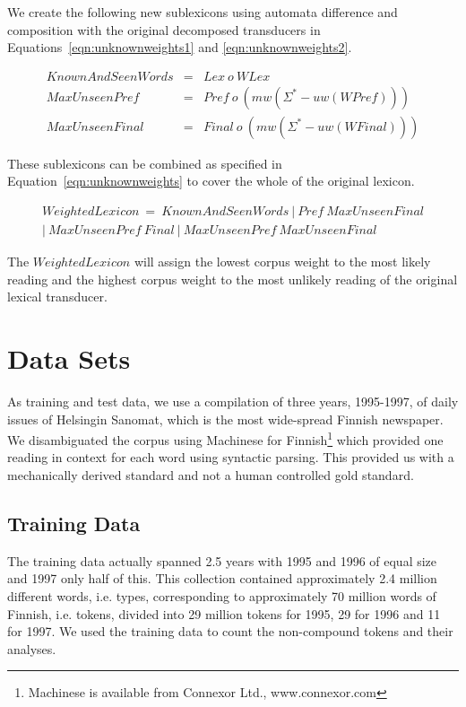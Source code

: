 \documentclass[a4paper]{article}
\begin{document}
We create the following new sublexicons using automata difference and
composition with the original decomposed transducers in
Equations~\ref{eqn:unknownweights1} and \ref{eqn:unknownweights2}.

\begin{eqnarray}
  \label{eqn:knownweights} KnownAndSeenWords & = & Lex~o~WLex\\
  \label{eqn:unknownweights1} MaxUnseenPref & = & Pref~o~(mw(\Sigma^* - uw(WPref)))\\
  \label{eqn:unknownweights2} MaxUnseenFinal & = & Final~o~(mw(\Sigma^* - uw(WFinal)))
\end{eqnarray}

These sublexicons can be combined as specified in
Equation~\ref{eqn:unknownweights} to cover the whole of the original
lexicon.

\begin{eqnarray}
  \label{eqn:unknownweights}
  WeightedLexicon~=~KnownAndSeenWords~|~Pref~MaxUnseenFinal \nonumber\\
  |~MaxUnseenPref~Final~|~MaxUnseenPref~MaxUnseenFinal~~
\end{eqnarray}

The $WeightedLexicon$ will assign the lowest corpus weight to the most
likely reading and the highest corpus weight to the most unlikely
reading of the original lexical transducer.

\section{Data Sets}
\label{Sect4}

As training and test data, we use a compilation of three years,
1995-1997, of daily issues of Helsingin Sanomat, which is the most
wide-spread Finnish newspaper. We disambiguated the corpus using
Machinese for Finnish\footnote{Machinese is available from Connexor
  Ltd., www.connexor.com} which provided one reading in context for
each word using syntactic parsing. This provided us with a
mechanically derived standard and not a human controlled gold
standard.

\subsection{Training Data}

The training data actually spanned 2.5 years with 1995 and 1996 of
equal size and 1997 only half of this. This collection contained
approximately 2.4 million different words, i.e. types, corresponding
to approximately 70 million words of Finnish, i.e. tokens, divided
into 29 million tokens for 1995, 29 for 1996 and 11 for 1997. We used
the training data to count the non-compound tokens and their analyses.
\end{document}
